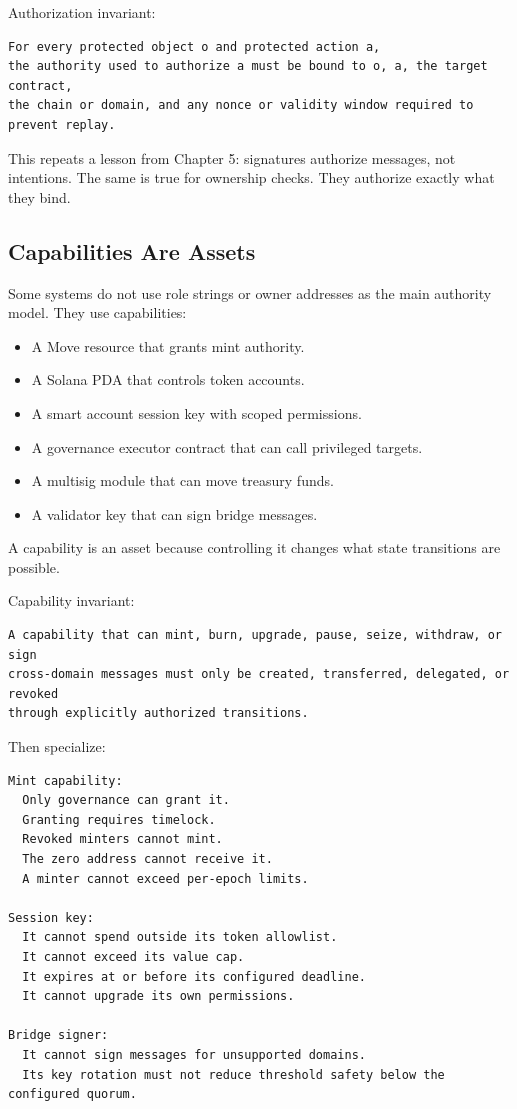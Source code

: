 Authorization invariant:

\begin{lstlisting}
For every protected object o and protected action a,
the authority used to authorize a must be bound to o, a, the target contract,
the chain or domain, and any nonce or validity window required to prevent replay.
\end{lstlisting}

This repeats a lesson from Chapter 5: signatures authorize messages, not
intentions. The same is true for ownership checks. They authorize
exactly what they bind.

\subsection{Capabilities Are Assets}

Some systems do not use role strings or owner addresses as the main
authority model. They use capabilities:

\begin{itemize}
\tightlist
\item
  A Move resource that grants mint authority.
\item
  A Solana PDA that controls token accounts.
\item
  A smart account session key with scoped permissions.
\item
  A governance executor contract that can call privileged targets.
\item
  A multisig module that can move treasury funds.
\item
  A validator key that can sign bridge messages.
\end{itemize}

A capability is an asset because controlling it changes what state
transitions are possible.

Capability invariant:

\begin{lstlisting}
A capability that can mint, burn, upgrade, pause, seize, withdraw, or sign
cross-domain messages must only be created, transferred, delegated, or revoked
through explicitly authorized transitions.
\end{lstlisting}

Then specialize:

\begin{lstlisting}
Mint capability:
  Only governance can grant it.
  Granting requires timelock.
  Revoked minters cannot mint.
  The zero address cannot receive it.
  A minter cannot exceed per-epoch limits.

Session key:
  It cannot spend outside its token allowlist.
  It cannot exceed its value cap.
  It expires at or before its configured deadline.
  It cannot upgrade its own permissions.

Bridge signer:
  It cannot sign messages for unsupported domains.
  Its key rotation must not reduce threshold safety below the configured quorum.
\end{lstlisting}

